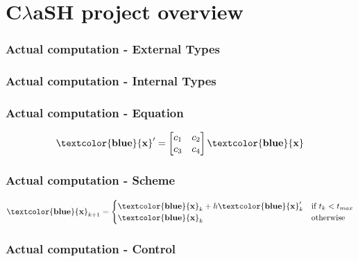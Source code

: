 \documentclass{beamer}[10]
\newcommand{\clash}{C$\lambda$aSH}
\newcommand{\ve}[1]{\mathbf{\textcolor{blue}{#1}}}
\begin{document}
\section{\clash{} project overview}

\begin{frame}
	\frametitle{Actual computation - External Types}
	
\end{frame}

\begin{frame}
	\frametitle{Actual computation - Internal Types}
	
\end{frame}

\begin{frame}
	\frametitle{Actual computation - Equation}
	\begin{equation}
		\ve{x}' = \begin{bmatrix}
		c_{1} & c_{2} \\ c_{3} & c_{4} \\
		\end{bmatrix} \ve{x}
	\end{equation}
	
\end{frame}

\begin{frame}
	\frametitle{Actual computation - Scheme}
	\begin{equation}
		\ve{x}_{k+1} = 
		\begin{cases} 
			\ve{x}_{k} + h\ve{x}_{k}' 		& \text{if } t_{k} < t_{max} \\
			\ve{x}_{k} 						& \text{otherwise} 
		\end{cases} 
	\end{equation}
	
\end{frame}

\begin{frame}
	\frametitle{Actual computation - Control}
	
\end{frame}
\end{document}
